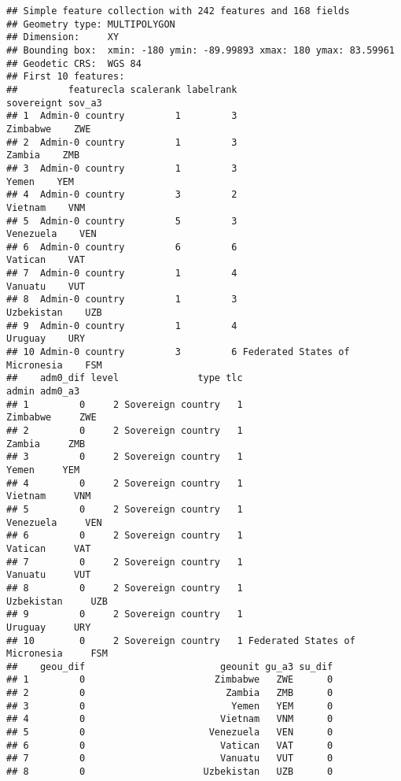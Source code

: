 \documentclass[
]{article}
\begin{document}
\begin{verbatim}
## Simple feature collection with 242 features and 168 fields
## Geometry type: MULTIPOLYGON
## Dimension:     XY
## Bounding box:  xmin: -180 ymin: -89.99893 xmax: 180 ymax: 83.59961
## Geodetic CRS:  WGS 84
## First 10 features:
##         featurecla scalerank labelrank                     sovereignt sov_a3
## 1  Admin-0 country         1         3                       Zimbabwe    ZWE
## 2  Admin-0 country         1         3                         Zambia    ZMB
## 3  Admin-0 country         1         3                          Yemen    YEM
## 4  Admin-0 country         3         2                        Vietnam    VNM
## 5  Admin-0 country         5         3                      Venezuela    VEN
## 6  Admin-0 country         6         6                        Vatican    VAT
## 7  Admin-0 country         1         4                        Vanuatu    VUT
## 8  Admin-0 country         1         3                     Uzbekistan    UZB
## 9  Admin-0 country         1         4                        Uruguay    URY
## 10 Admin-0 country         3         6 Federated States of Micronesia    FSM
##    adm0_dif level              type tlc                          admin adm0_a3
## 1         0     2 Sovereign country   1                       Zimbabwe     ZWE
## 2         0     2 Sovereign country   1                         Zambia     ZMB
## 3         0     2 Sovereign country   1                          Yemen     YEM
## 4         0     2 Sovereign country   1                        Vietnam     VNM
## 5         0     2 Sovereign country   1                      Venezuela     VEN
## 6         0     2 Sovereign country   1                        Vatican     VAT
## 7         0     2 Sovereign country   1                        Vanuatu     VUT
## 8         0     2 Sovereign country   1                     Uzbekistan     UZB
## 9         0     2 Sovereign country   1                        Uruguay     URY
## 10        0     2 Sovereign country   1 Federated States of Micronesia     FSM
##    geou_dif                        geounit gu_a3 su_dif
## 1         0                       Zimbabwe   ZWE      0
## 2         0                         Zambia   ZMB      0
## 3         0                          Yemen   YEM      0
## 4         0                        Vietnam   VNM      0
## 5         0                      Venezuela   VEN      0
## 6         0                        Vatican   VAT      0
## 7         0                        Vanuatu   VUT      0
## 8         0                     Uzbekistan   UZB      0

\end{verbatim}
\end{document}
